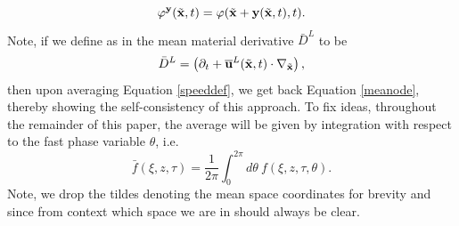 \documentclass{JFM_Style/jfm}
\newcommand{\pd}{\partial}
\begin{document}
\[
\varphi^{\bf y}(\tilde{{\bf x}},t) = \varphi(\tilde{{\bf x}}+{\bf y}(\tilde{\bf x},t),t).
\]
Note, if we define as in \cite{andrews} the mean material derivative $\bar{D}^{L}$ to be 
\[
\bar{D}^{L} = \left(\pd_{t} + \overline{{\bf u}}^{L}(\tilde{{\bf x}},t)\cdot \nabla_{\tilde{{\bf x}}} \right),
\]
then upon averaging Equation \eqref{speeddef}, we get back Equation \eqref{meanode}, thereby showing the self-consistency of this approach.  To fix ideas, throughout the remainder of this paper, the average will be given by integration with respect to the fast phase variable $\theta$, i.e.
\[
\bar{f}(\xi,z,\tau) = \frac{1}{2\pi}\int_{0}^{2\pi} d\theta~ f(\xi,z,\tau,\theta).
\]
Note, we drop the tildes denoting the mean space coordinates for brevity and since from context which space we are in should always be clear.  
\end{document}
